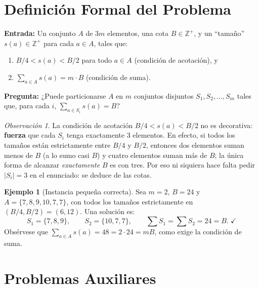 \documentclass[12pt,a4paper]{article}
\theoremstyle{definition}
\newtheorem{example}{Ejemplo}
\theoremstyle{remark}
\newtheorem{remark}{Observación}
\newcommand{\TPART}{\textsc{3-Partition}}
\begin{document}
\section{Definición Formal del Problema}

\begin{tcolorbox}[colback=blue!5, colframe=blue!40, title={\TPART\ (Problema de la 3-Partición) [SP15]}]
\textbf{Entrada:} Un conjunto $A$ de $3m$ elementos, una cota $B \in \mathbb{Z}^+$,
y un ``tamaño'' $s(a) \in \mathbb{Z}^+$ para cada $a \in A$, tales que:
\begin{enumerate}
  \item $B/4 < s(a) < B/2$ para todo $a \in A$ \quad (condición de acotación), y
  \item $\displaystyle\sum_{a \in A} s(a) = m \cdot B$ \quad (condición de suma).
\end{enumerate}
\textbf{Pregunta:} ¿Puede particionarse $A$ en $m$ conjuntos disjuntos
$S_1, S_2, \ldots, S_m$ tales que, para cada $i$,
$\displaystyle\sum_{a \in S_i} s(a) = B$?
\end{tcolorbox}

\begin{remark}
La condición de acotación $B/4 < s(a) < B/2$ no es decorativa: \textbf{fuerza}
que cada $S_i$ tenga exactamente 3 elementos. En efecto, si todos los tamaños
están estrictamente entre $B/4$ y $B/2$, entonces dos elementos suman menos de
$B$ (a lo sumo casi $B$) y cuatro elementos suman más de $B$; la única forma de
alcanzar \emph{exactamente} $B$ es con tres. Por eso ni siquiera hace falta pedir
$|S_i| = 3$ en el enunciado: se deduce de las cotas.
\end{remark}

\begin{example}[Instancia pequeña correcta]
Sea $m = 2$, $B = 24$ y
$A = \{7, 8, 9, 10, 7, 7\}$, con todos los tamaños estrictamente en
$(B/4, B/2) = (6, 12)$.
Una solución es:
\[
  S_1 = \{7, 8, 9\}, \qquad S_2 = \{10, 7, 7\}, \qquad
  \textstyle\sum S_1 = \sum S_2 = 24 = B. \;\checkmark
\]
Obsérvese que $\sum_{a\in A} s(a) = 48 = 2 \cdot 24 = m B$, como exige la
condición de suma.
\end{example}

\section{Problemas Auxiliares}
\end{document}
